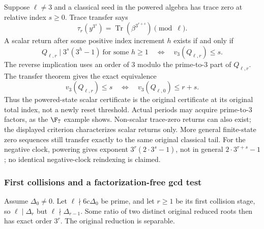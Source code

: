 \documentclass[11pt,a4paper]{article}
\theoremstyle{definition}\newtheorem{definition}[theorem]{Definition}
\theoremstyle{remark}\newtheorem{remark}[theorem]{Remark}
\DeclareMathOperator{\Tr}{Tr}\DeclareMathOperator{\tr}{tr}\DeclareMathOperator{\Nm}{N}
\begin{document}
Suppose $\ell\ne3$ and a classical seed in the powered algebra
has trace zero at relative index $s\ge0$. Trace transfer says
\[
 \tau_r(y^{3^s})=\Tr(\beta^{3^{r+s}})\pmod\ell.
\]
A scalar return after some positive index increment $h$ exists if
and only if
\[
 Q_{\ell,r}\mid3^s(3^h-1)\ \text{for some }h\ge1
 \quad\Longleftrightarrow\quad v_3(Q_{\ell,r})\le s.
\]
The reverse implication uses an order of $3$ modulo the prime-to-$3$
part of $Q_{\ell,r}$. The transfer theorem gives the exact equivalence
\begin{equation}\label{R15:eq:threshold}
 v_3(Q_{\ell,r})\le s
 \quad\Longleftrightarrow\quad v_3(Q_{\ell,0})\le r+s.
\end{equation}
Thus the powered-state scalar certificate is the original certificate
at its original total index, not a newly reset threshold. Actual
periods may acquire prime-to-$3$ factors, as the $\F_7$ example
shows. Non-scalar trace-zero returns can also exist; the displayed
criterion characterizes scalar returns only. More general finite-state
zero sequences still transfer exactly to the same original classical
tail. For the negative clock, powering gives exponent
$3^r(2\cdot3^s-1)$, not in general $2\cdot3^{r+s}-1$;
no identical negative-clock reindexing is claimed.

\subsubsection{First collisions and a factorization-free gcd test}

Assume $\Delta_0\ne0$. Let $\ell\nmid6c\Delta_0$ be prime,
and let $r\ge1$ be its first collision stage, so
$\ell\mid\Delta_r$ but $\ell\nmid\Delta_{r-1}$.
Some ratio of two distinct original reduced roots then has exact
order $3^r$. The original reduction is separable.
\end{document}
